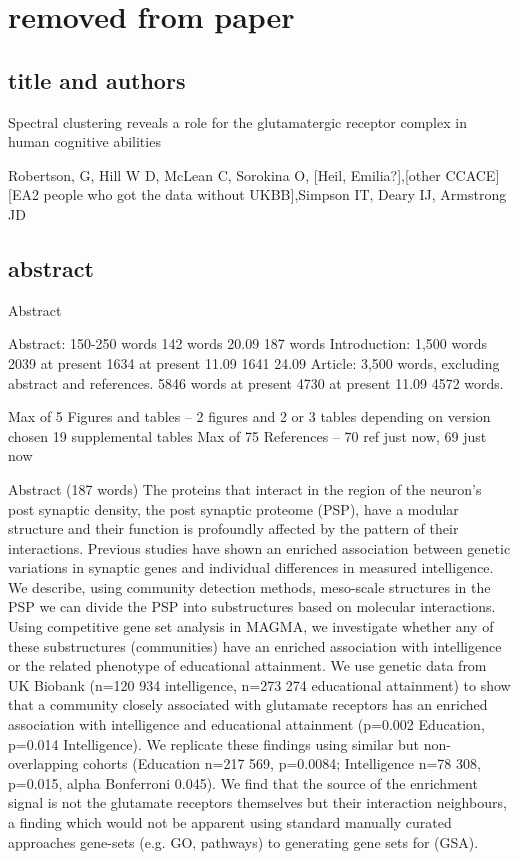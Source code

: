 \chapter{removed from paper}

\section{title and authors}
Spectral clustering reveals a role for the glutamatergic receptor complex in human cognitive abilities

Robertson, G, Hill W D, McLean C, Sorokina O, [Heil, Emilia?],[other CCACE] [EA2
people who got the data without UKBB],Simpson IT, Deary IJ, Armstrong JD



\section{abstract}
Abstract

Abstract: 150-250 words 
142 words
20.09 187 words
Introduction: 1,500 words
2039 at present
1634 at present 11.09
1641 24.09
Article: 3,500 words, excluding abstract and references.
5846 words at present
4730 at present 11.09
4572 words.


Max of 5 Figures and tables –
 2 figures and 2 or 3 tables depending on version chosen
19 supplemental tables
Max of 75 References – 70 ref just now, 69 just now

Abstract (187 words)
The proteins that interact in the region of the neuron’s post synaptic density, the post synaptic proteome (PSP), have a modular structure and their function is profoundly affected by the pattern of their interactions.
Previous studies have shown an enriched association between genetic variations in synaptic genes and individual differences in measured intelligence. We describe, using community detection methods, meso-scale structures in the PSP we can divide the PSP into substructures based on molecular interactions. Using competitive gene set analysis in MAGMA, we investigate whether any of these substructures (communities) have an enriched association with intelligence or the related phenotype of educational attainment. We use genetic data from UK Biobank (n=120 934 intelligence, n=273 274 educational attainment) to show that a community closely associated with glutamate receptors has an enriched association with intelligence and educational attainment (p=0.002 Education, p=0.014 Intelligence). We replicate these findings using similar but non-overlapping cohorts (Education n=217 569, p=0.0084; Intelligence n=78 308, p=0.015, alpha Bonferroni 0.045). We find that the source of the enrichment signal is not the glutamate receptors themselves but their interaction neighbours, a finding which would not be apparent using standard manually curated approaches gene-sets (e.g. GO, pathways) to generating gene sets for (GSA).

